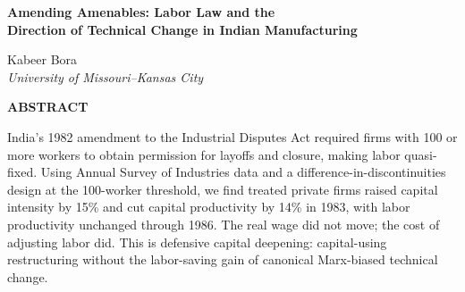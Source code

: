 \documentclass[11pt]{article}
\begin{document}
\begin{center}
{\Large\bfseries Amending Amenables: Labor Law and the\\[2pt]
Direction of Technical Change in Indian Manufacturing\par}

\vspace{14pt}

Kabeer Bora\\[2pt]
\textit{University of Missouri--Kansas City}

\vspace{18pt}

\textbf{ABSTRACT}
\end{center}

\vspace{4pt}

India's 1982 amendment to the Industrial Disputes Act required firms with 100 or more workers to obtain permission for layoffs and closure, making labor quasi-fixed. Using Annual Survey of Industries data and a difference-in-discontinuities design at the 100-worker threshold, we find treated private firms raised capital intensity by 15\% and cut capital productivity by 14\% in 1983, with labor productivity unchanged through 1986. The real wage did not move; the cost of adjusting labor did. This is defensive capital deepening: capital-using restructuring without the labor-saving gain of canonical Marx-biased technical change.
\end{document}
